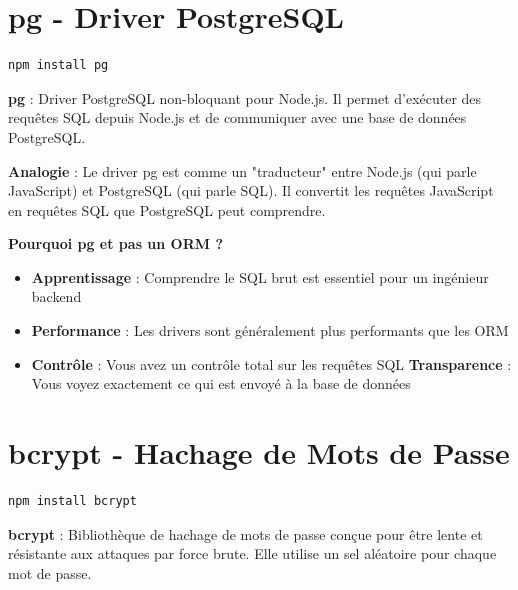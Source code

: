 \section{pg - Driver PostgreSQL}

\begin{lstlisting}[style=bash, caption=Installation du driver pg]
npm install pg
\end{lstlisting}

\begin{definitionbox}
    \textbf{pg} : Driver PostgreSQL non-bloquant pour Node.js. Il permet d'exécuter des requêtes SQL depuis Node.js et de communiquer avec une base de données PostgreSQL.
\end{definitionbox}

\begin{analogybox}
    \textbf{Analogie} : Le driver pg est comme un "traducteur" entre Node.js (qui parle JavaScript) et PostgreSQL (qui parle SQL). Il convertit les requêtes JavaScript en requêtes SQL que PostgreSQL peut comprendre.
\end{analogybox}

\textbf{Pourquoi pg et pas un ORM ?}
\begin{itemize}
    \item \textbf{Apprentissage} : Comprendre le SQL brut est essentiel pour un ingénieur backend
    \item \textbf{Performance} : Les drivers sont généralement plus performants que les ORM
    \item \textbf{Contrôle} : Vous avez un contrôle total sur les requêtes SQL
    \text \textbf{Transparence} : Vous voyez exactement ce qui est envoyé à la base de données
\end{itemize}

\section{bcrypt - Hachage de Mots de Passe}

\begin{lstlisting}[style=bash, caption=Installation de bcrypt]
npm install bcrypt
\end{lstlisting}

\begin{definitionbox}
    \textbf{bcrypt} : Bibliothèque de hachage de mots de passe conçue pour être lente et résistante aux attaques par force brute. Elle utilise un sel aléatoire pour chaque mot de passe.
\end{definitionbox}

